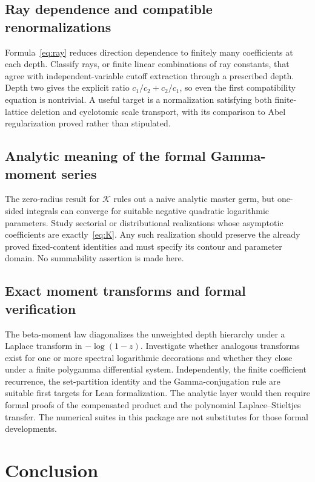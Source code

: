 \documentclass[11pt,oneside]{article}
\numberwithin{equation}{section}
\theoremstyle{definition}
\theoremstyle{remark}
\newcommand{\KK}{\mathcal K}
\begin{document}
\subsection{Ray dependence and compatible renormalizations}

Formula~\eqref{eq:ray} reduces direction dependence to finitely many
coefficients at each depth. Classify rays, or finite linear combinations of
ray constants, that agree with independent-variable cutoff extraction
through a prescribed depth. Depth two gives the explicit ratio
$c_1/c_2+c_2/c_1$, so even the first compatibility equation is nontrivial.
A useful target is a normalization satisfying both finite-lattice deletion
and cyclotomic scale transport, with its comparison to Abel regularization
proved rather than stipulated.

\subsection{Analytic meaning of the formal Gamma-moment series}

The zero-radius result for $\KK$ rules out a naive analytic master germ, but
one-sided integrals can converge for suitable negative quadratic logarithmic
parameters. Study sectorial or distributional realizations whose asymptotic
coefficients are exactly~\eqref{eq:K}. Any such realization should preserve
the already proved fixed-content identities and must specify its contour
and parameter domain. No summability assertion is made here.

\subsection{Exact moment transforms and formal verification}

The beta-moment law diagonalizes the unweighted depth hierarchy under a
Laplace transform in $-\log(1-z)$. Investigate whether analogous transforms
exist for one or more spectral logarithmic decorations and whether they
close under a finite polygamma differential system. Independently, the
finite coefficient recurrence, the set-partition identity and the
Gamma-conjugation rule are suitable first targets for Lean formalization.
The analytic layer would then require formal proofs of the compensated
product and the polynomial Laplace--Stieltjes transfer. The numerical suites
in this package are not substitutes for those formal developments.

\section*{Conclusion}
\end{document}
